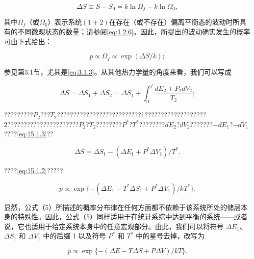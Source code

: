 \begin{equation}\tag{15.1.1}\label{eq:15.1.1}
\Delta S \equiv S - S _ { 0 } = k \ln \Omega _ { f } - k \ln \Omega _ { 0 } ,
\end{equation}

其中\(\Omega_{f}\)（或\(\Omega_{0}\)）表示系统\((1+2)\)在存在（或不存在）偏离平衡态的波动时所具有的不同微观状态的数量；请参阅\autoref{eq:1.2.6}。因此，所提出的波动确实发生的概率可由下式给出：

\begin{equation}\tag{15.1.2}\label{eq:15.1.2}
p \propto \Omega _ { f } \propto \exp ( \Delta S / k ) ;
\end{equation}

参见第3.1节，尤其是\autoref{eq:3.1.3}。从其他热力学量的角度来看，我们可以写成

\begin{equation}\tag{15.1.3}\label{eq:15.1.3}
\Delta S = \Delta S _ { 1 } + \Delta S _ { 2 } = \Delta S _ { 1 } + \int _ { 0 } ^{f} \frac { d E _ { 2 } + P _ { 2 } d V _ { 2 } } { T _ { 2 } } ;
\end{equation}

?????????\(P_{2}\)???\(T_{2}\)??????????????????????????1???????????????????2??????????????????????\(P_{2}\)?\(T_{2}\)????????\(P^{*}\)?\(T^{*}\)????????\(dE_{2}\)?\(dV_{2}\)???????\(-dE_{1}\)?\(-dV_{1}\)????\autoref{eq:15.1.3}??

\begin{equation}\tag{15.1.4}\label{eq:15.1.4}
\Delta S = \Delta S _ { 1 } - ( \Delta E _ { 1 } + P ^{*} \Delta V _ { 1 } ) / T ^{*} .
\end{equation}

????\autoref{eq:15.1.2}?????

\begin{equation}\tag{15.1.5}\label{eq:15.1.5}
p \propto \exp \{ - ( \Delta E _ { 1 } - T ^{*} \Delta S _ { 1 } + P ^{*} \Delta V _ { 1 } ) / k T ^{*} \} .
\end{equation}

显然，公式（5）所描述的概率分布律在任何方面都不依赖于该系统所处的储层本身的特殊性。因此，公式（5）同样适用于在统计系综中达到平衡的系统------或者说，它也适用于给定系统本身中的任意宏观部分。由此，我们可以将符号 \(\Delta E_{1}\)、\(\Delta S_{1}\) 和 \(\Delta V_{1}\) 中的后缀 1 以及符号 \(P^{*}\) 和 \(T^{*}\) 中的星号去掉，改写为

\begin{equation}\tag{15.1.6}\label{eq:15.1.6}
p \propto \exp \{ - ( \Delta E - T \Delta S + P \Delta V ) / k T \} .
\end{equation}

